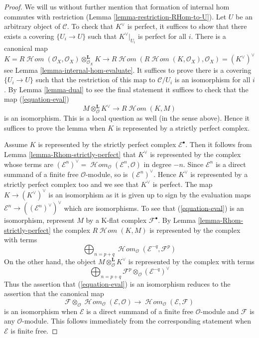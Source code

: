 \documentclass[10pt,a4paper]{amsart}
\theoremstyle{plain}
\theoremstyle{definition}
\theoremstyle{remark}
\numberwithin{equation}{subsection}
\def\SheafHom{\mathop{\mathcal{H}\!\mathit{om}}\nolimits}
\begin{document}
\begin{proof}
We will us without further mention that formation of internal hom commutes
with restriction (Lemma \ref{lemma-restriction-RHom-to-U}). Let $U$
be an arbitrary object of $\mathcal{C}$. To check that
$K^\vee$ is perfect, it suffices to show that there exists a covering
$\{U_i \to U\}$ such that $K^\vee|_{U_i}$ is perfect for all $i$.
There is a canonical map
$$
K = R\SheafHom(\mathcal{O}_X, \mathcal{O}_X)
\otimes_{\mathcal{O}_X}^\mathbf{L} K \longrightarrow
R\SheafHom(R\SheafHom(K, \mathcal{O}_X), \mathcal{O}_X) =
(K^\vee)^\vee
$$
see Lemma \ref{lemma-internal-hom-evaluate}. It suffices to prove there
is a covering $\{U_i \to U\}$ such that the restriction of this map
to $\mathcal{C}/U_i$ is an isomorphism for all $i$.
By Lemma \ref{lemma-dual} to see the final statement it suffices to check
that the map (\ref{equation-eval})
$$
M \otimes^\mathbf{L}_\mathcal{O} K^\vee
\longrightarrow
R\SheafHom(K, M)
$$
is an isomorphism. This is a local question as well (in the sense above).
Hence it suffices to prove the lemma when $K$ is represented
by a strictly perfect complex.

\medskip\noindent
Assume $K$ is represented by the strictly perfect complex
$\mathcal{E}^\bullet$. Then it follows from
Lemma \ref{lemma-Rhom-strictly-perfect}
that $K^\vee$ is represented by the complex whose terms are
$(\mathcal{E}^n)^\vee =
\SheafHom_\mathcal{O}(\mathcal{E}^n, \mathcal{O})$
in degree $-n$. Since $\mathcal{E}^n$ is a direct summand of a finite
free $\mathcal{O}$-module, so is $(\mathcal{E}^n)^\vee$.
Hence $K^\vee$ is represented by a strictly perfect complex too 
and we see that $K^\vee$ is perfect.
The map $K \to (K^\vee)^\vee$ is an isomorphism as it is given up
to sign by the evaluation maps
$\mathcal{E}^n \to ((\mathcal{E}^n)^\vee)^\vee$ which are
isomorphisms. To see that (\ref{equation-eval}) is an isomorphism, represent
$M$ by a K-flat complex $\mathcal{F}^\bullet$.
By Lemma \ref{lemma-Rhom-strictly-perfect} the complex
$R\SheafHom(K, M)$ is represented by the complex with terms
$$
\bigoplus\nolimits_{n = p + q}
\SheafHom_\mathcal{O}(\mathcal{E}^{-q}, \mathcal{F}^p)
$$
On the other hand, the object $M \otimes^\mathbf{L}_\mathcal{O} K^\vee$
is represented by the complex with terms
$$
\bigoplus\nolimits_{n = p + q}
\mathcal{F}^p \otimes_\mathcal{O} (\mathcal{E}^{-q})^\vee
$$
Thus the assertion that (\ref{equation-eval}) is an isomorphism
reduces to the assertion that the canonical map
$$
\mathcal{F}
\otimes_\mathcal{O}
\SheafHom_\mathcal{O}(\mathcal{E}, \mathcal{O})
\longrightarrow
\SheafHom_\mathcal{O}(\mathcal{E}, \mathcal{F})
$$
is an isomorphism when $\mathcal{E}$ is a direct summand of a finite
free $\mathcal{O}$-module and $\mathcal{F}$ is any $\mathcal{O}$-module.
This follows immediately from the corresponding statement when
$\mathcal{E}$ is finite free.
\end{proof}
\end{document}
